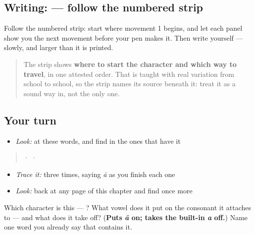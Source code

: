 \subsection*{Writing:  — follow the numbered strip}

Follow the numbered strip: start where movement 1 begins, and let each panel show you the next movement before your pen makes it. Then write  yourself — slowly, and larger than it is printed.

\begin{quote}
The strip shows \textbf{where to start the character and which way to travel}, in one attested order. That is taught with real variation from school to school, so the strip names its source beneath it: treat it as a sound way in, not the only one.
\end{quote}

\subsection*{Your turn}
\begin{itemize}
\raggedright
  \item \emph{Look:} at these words, and find  in the ones that have it
\end{itemize}

\begin{quote}
  ·    ·  
\end{quote}

\begin{itemize}
\raggedright
  \item \emph{Trace it:}  three times, saying \emph{ā} as you finish each one
  \item \emph{Look:} back at any page of this chapter and find  once more
\end{itemize}

\begin{tcolorbox}[breakable,colback=teal!4,colframe=teal!35!black,title={Before you move on}]
Which character is this — ? What vowel does it put on the consonant it attaches to — and what does it take off? (\textbf{Puts \emph{ā} on; takes the built-in \emph{a} off.}) Name one word you already say that contains it.
\end{tcolorbox}
